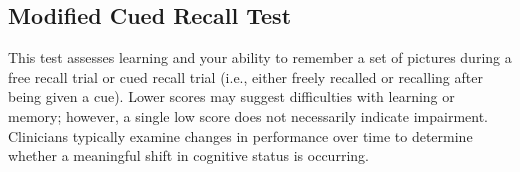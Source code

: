 \subsection{Modified Cued Recall Test}

This test assesses learning and your ability to remember a set of pictures
during a free recall trial or cued recall trial (i.e., either freely recalled or
recalling after being given a cue). Lower scores may suggest difficulties with
learning or memory; however, a single low score does not necessarily indicate
impairment. Clinicians typically examine changes in performance over time to
determine whether a meaningful shift in cognitive status is occurring.